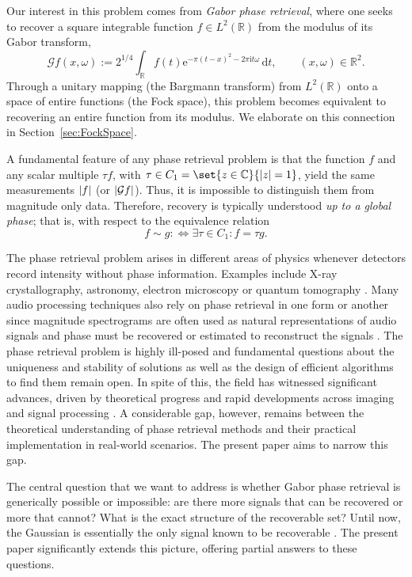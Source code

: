 \documentclass{article}
\newcommand{\bbC}{\mathbb{C}}
\newcommand{\bbR}{\mathbb{R}}
\newcommand{\calG}{\mathcal{G}}
\newcommand{\rme}{\mathrm{e}}
\newcommand{\rmi}{\mathrm{i}}
\newcommand{\dd}{\,\mathrm{d}}
\DeclarePairedDelimiter{\abs}{\lvert}{\rvert}
\theoremstyle{remark}
\begin{document}
    Our interest in this problem comes from \emph{Gabor phase retrieval}, where one seeks to recover a square integrable function $f \in L^2(\bbR)$ from the modulus of its Gabor transform,
    \begin{equation}\label{eq:def_Gabor}
        \calG f (x,\omega) := 2^{1/4} \int_\bbR f(t) \rme^{-\pi(t-x)^2 - 2 \pi \rmi t \omega} \dd t, \qquad (x,\omega) \in \bbR^2.
    \end{equation}
    Through a unitary mapping (the Bargmann transform) from $L^2(\bbR)$ onto a space of entire functions (the Fock space), this problem becomes equivalent to recovering an entire function from its modulus. We elaborate on this connection in Section~\ref{sec:FockSpace}.
    
    A fundamental feature of any phase retrieval problem is that the function $f$ and any scalar multiple $\tau f$, with $\tau \in C_1 = \set{z \in \bbC}{\abs{z} = 1}$, yield the same measurements $\abs{f}$ (or $\abs{\calG f}$). Thus, it is impossible to distinguish them from magnitude only data. Therefore, recovery is typically understood \emph{up to a global phase}; that is, with respect to the equivalence relation
    \begin{equation*}
        f \sim g :\iff \exists \tau \in C_1 : f = \tau g.
    \end{equation*}

    The phase retrieval problem arises in different areas of physics whenever detectors record intensity without phase information. Examples include X-ray crystallography, astronomy, electron microscopy or quantum tomography \cite{Allain2025Phasebook}. Many audio processing techniques also rely on phase retrieval in one form or another since magnitude spectrograms are often used as natural representations of audio signals and phase must be recovered or estimated to reconstruct the signals \cite{Flanagan1966Phase,Griffin1984Signal,Wang2018End}. The phase retrieval problem is highly ill-posed and fundamental questions about the uniqueness and stability of solutions as well as the design of efficient algorithms to find them remain open. In spite of this, the field has witnessed significant advances, driven by theoretical progress and rapid developments across imaging and signal processing \cite{Allain2025Phasebook}. A considerable gap, however, remains between the theoretical understanding of phase retrieval methods and their practical implementation in real-world scenarios. The present paper aims to narrow this gap.

    The central question that we want to address is whether Gabor phase retrieval is generically possible or impossible: are there more signals that can be recovered or more that cannot? What is the exact structure of the recoverable set? Until now, the Gaussian is essentially the only signal known to be recoverable \cite{Alaifari2024On}. The present paper significantly extends this picture, offering partial answers to these questions.
\end{document}
